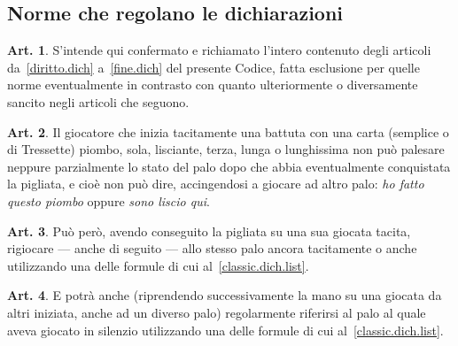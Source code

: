\documentclass[italian,a4paper]{book}
\theoremstyle{definition}
\newtheorem{art}{Art.}
\begin{document}
\subsection{Norme che regolano le dichiarazioni}
\begin{art}\label{classic.dich}
S'intende qui confermato e richiamato l'intero contenuto degli articoli
da~\ref{diritto.dich} a~\ref{fine.dich} del presente Codice, fatta esclusione per quelle norme eventualmente in contrasto con quanto ulteriormente o diversamente sancito negli articoli che seguono.
\end{art}
\begin{art}
Il giocatore che inizia tacitamente una battuta con una carta (semplice o di
Tressette) piombo, sola, lisciante, terza, lunga o lunghissima non può
palesare neppure parzialmente lo stato del palo dopo che abbia eventualmente
conquistata la pigliata, e cioè non può dire, accingendosi a giocare ad
altro palo: \emph{ho fatto questo piombo} oppure \emph{sono liscio qui}.
\end{art}
\begin{art}\label{classic.dich2}
Può però, avendo conseguito la pigliata su una sua giocata tacita, rigiocare
--- anche di seguito --- allo stesso palo ancora tacitamente o anche
utilizzando una delle formule di cui al~\ref{classic.dich.list}.
\end{art}
\begin{art}
E potrà anche (riprendendo successivamente la mano su una giocata da altri
iniziata, anche ad un diverso palo) regolarmente riferirsi al palo al quale
aveva giocato in silenzio utilizzando una delle formule di cui
al~\ref{classic.dich.list}.
\end{art}
\end{document}
